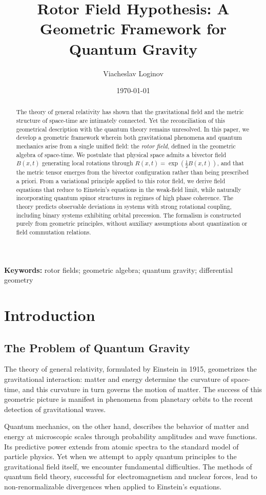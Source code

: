 \documentclass[11pt,a4paper]{article}
\title{Rotor Field Hypothesis: A Geometric Framework for Quantum Gravity}
\author[1]{Viacheslav Loginov}
\affil[1]{Kyiv, Ukraine\\ \texttt{barthez.slavik@gmail.com}}
\date{\today} %
\numberwithin{equation}{section}
\theoremstyle{plain}
\theoremstyle{definition}
\theoremstyle{remark}
\newcommand{\keywords}{\textbf{Keywords:} rotor fields; geometric algebra; quantum gravity; differential geometry}
\begin{document}
\maketitle

\begin{abstract}
The theory of general relativity has shown that the gravitational field and the metric structure of space-time are intimately connected. Yet the reconciliation of this geometrical description with the quantum theory remains unresolved. In this paper, we develop a geometric framework wherein both gravitational phenomena and quantum mechanics arise from a single unified field: the \emph{rotor field}, defined in the geometric algebra of space-time. We postulate that physical space admits a bivector field $B(x,t)$ generating local rotations through $R(x,t)=\exp(\frac{1}{2}B(x,t))$, and that the metric tensor emerges from the bivector configuration rather than being prescribed a priori. From a variational principle applied to this rotor field, we derive field equations that reduce to Einstein's equations in the weak-field limit, while naturally incorporating quantum spinor structures in regimes of high phase coherence. The theory predicts observable deviations in systems with strong rotational coupling, including binary systems exhibiting orbital precession. The formalism is constructed purely from geometric principles, without auxiliary assumptions about quantization or field commutation relations.
\end{abstract}

\keywords

\section{Introduction}
\label{sec:intro}

\subsection{The Problem of Quantum Gravity}

The theory of general relativity, formulated by Einstein in 1915, geometrizes the gravitational interaction: matter and energy determine the curvature of space-time, and this curvature in turn governs the motion of matter. The success of this geometric picture is manifest in phenomena from planetary orbits to the recent detection of gravitational waves.

Quantum mechanics, on the other hand, describes the behavior of matter and energy at microscopic scales through probability amplitudes and wave functions. Its predictive power extends from atomic spectra to the standard model of particle physics. Yet when we attempt to apply quantum principles to the gravitational field itself, we encounter fundamental difficulties. The methods of quantum field theory, successful for electromagnetism and nuclear forces, lead to non-renormalizable divergences when applied to Einstein's equations.
\end{document}
